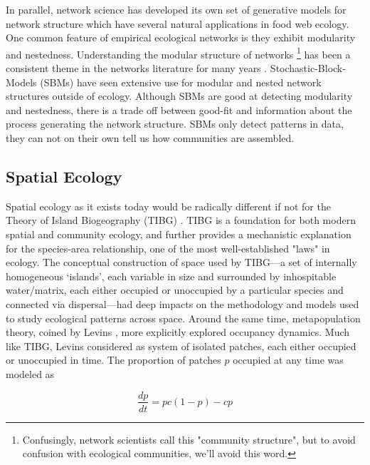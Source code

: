 \documentclass[]{article}
\begin{document}
In parallel, network science has developed
its own set of generative models for network structure which have
several natural applications in food web ecology.
One common feature of empirical ecological networks is they exhibit modularity and nestedness. Understanding the modular structure of networks \footnote{Confusingly, network scientists call this "community structure", but to avoid confusion with ecological communities, we'll avoid this word.} has been a consistent theme in the networks literature for many years \citep{newman, clauset}.
Stochastic-Block-Models (SBMs) have seen extensive use for modular and
nested network structures outside of ecology. Although SBMs are good at detecting modularity and nestedness, there is a trade off between good-fit and information about the process generating the network structure. SBMs only detect patterns in data, they can not on their own tell us how communities are assembled.


\hypertarget{spatial-ecology}{%
\subsection{Spatial Ecology}\label{spatial-ecology}}

Spatial ecology as it exists today would be radically different if not
for the Theory of Island Biogeography (TIBG)
\citep{macarthur_theory_2016}. TIBG is a foundation for both
modern spatial and community ecology, and further provides a mechanistic
explanation for the species-area relationship, one of the most
well-established "laws" in ecology. The conceptual construction of
space used by TIBG---a set of internally homogeneous `islands', each
variable in size and surrounded by inhospitable water/matrix, each
either occupied or unoccupied by a particular species and connected via
dispersal---had deep impacts on the methodology and models used to study
ecological patterns across space. Around the same time, metapopulation
theory, coined by Levins \citep{levins_demographic_1969}, more
explicitly explored occupancy dynamics. Much like TIBG, Levins
considered as system of isolated patches, each either occupied or
unoccupied in time. The proportion of patches \(p\) occupied at any time
was modeled as

\[\frac{dp}{dt} = pc(1-p) - cp\]
\end{document}
